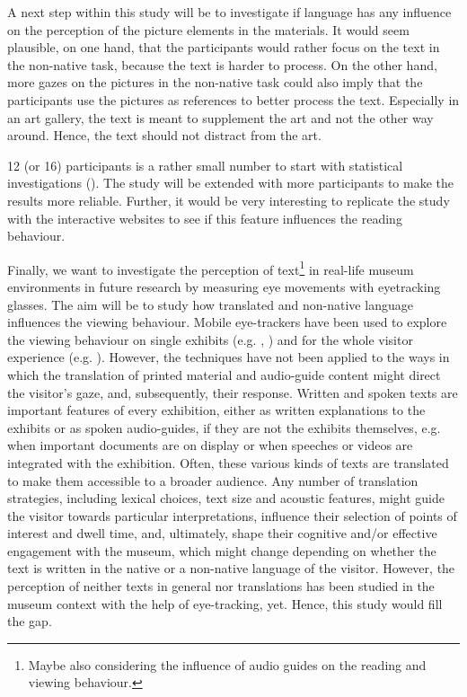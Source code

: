 \documentclass[output=paper]{langscibook}
\begin{document}
A next step within this study will be to investigate if language has any influence on the perception of the picture elements in the materials. It would seem plausible, on one hand, that the participants would rather focus on the text in the non-native task, because the text is harder to process. On the other hand, more gazes on the pictures in the non-native task could also imply that the participants use the pictures as references to better process the text. Especially in an art gallery, the text is meant to supplement the art and not the other way around. Hence, the text should not distract from the art. 


12 (or 16) participants is a rather small number to start with statistical investigations (\citealt{o2009eye}). The study will be extended with more participants to make the results more reliable. Further, it would be very interesting to replicate the study with the interactive websites to see if this feature influences the reading behaviour.

Finally, we want to investigate the perception of text\footnote{Maybe also considering the influence of audio guides on the reading and viewing behaviour.} in real-life museum environments in future research by measuring eye movements with eyetracking glasses. The aim will be to study how translated and non-native language influences the viewing behaviour. Mobile eye-trackers have been used to explore the viewing behaviour on single exhibits (e.g. \citealt{walker2017looking}, \citealt{tatler2016looking}) and for the whole visitor experience (e.g. \citealt{eghbal2016use}). However, the techniques have not been applied to the ways in which the translation of printed material and audio-guide content might direct the visitor’s gaze, and, subsequently, their response. Written and spoken texts are important features of every exhibition, either as written explanations to the exhibits or as spoken audio-guides, if they are not the exhibits themselves, e.g. when important documents are on display or when speeches or videos are integrated with the exhibition. Often, these various kinds of texts are translated to make them accessible to a broader audience. Any number of translation strategies, including lexical choices, text size and acoustic features, might guide the visitor towards particular interpretations, influence their selection of points of interest and dwell time, and, ultimately, shape their cognitive and/or effective engagement with the museum, which might change depending on whether the text is written in the native or a non-native language of the visitor. However, the perception of neither texts in general nor translations has been studied in the museum context with the help of eye-tracking, yet. Hence, this study would fill the gap.

{\sloppy\printbibliography[heading=subbibliography,notkeyword=this]}
\end{document}
